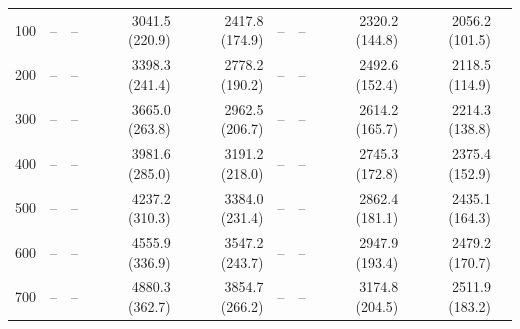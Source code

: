 \begin{table}[htp]
{\begin{tabular}{|r|r|r|r|r|r|r|r|r|r|}
    100& --               & --             & 3041.5 (220.9) & 2417.8 (174.9) &  --              &  --            & 2320.2 (144.8) & 2056.2 (101.5)\\
    200& --               & --             & 3398.3 (241.4) & 2778.2 (190.2) &  --              &  --            & 2492.6 (152.4) & 2118.5 (114.9) \\
    300& --               & --             & 3665.0 (263.8) & 2962.5 (206.7) &  --              &  --            & 2614.2 (165.7) & 2214.3 (138.8) \\
    400& --               & --             & 3981.6 (285.0) & 3191.2 (218.0) &  --              &  --            & 2745.3 (172.8) & 2375.4 (152.9) \\
    500& --               & --             & 4237.2 (310.3) & 3384.0 (231.4) &  --              &  --            & 2862.4 (181.1) & 2435.1 (164.3) \\
    600& --               & --             & 4555.9 (336.9) & 3547.2 (243.7) &  --              &  --            & 2947.9 (193.4) & 2479.2 (170.7)\\
    700& --               & --             & 4880.3 (362.7) & 3854.7 (266.2) &  --              &  --            & 3174.8 (204.5) & 2511.9 (183.2)\\
    \hline
  \end{tabular}
  }
\end{table}

